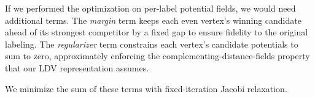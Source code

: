 \documentclass[journal]{vgtc}                     %
\begin{document}
If we performed the optimization on per-label potential fields, we would need additional terms. The \emph{margin} term keeps each even vertex's winning candidate ahead of its strongest competitor by a fixed gap to ensure fidelity to the original labeling.
The \emph{regularizer} term constrains each vertex's candidate potentials to sum to zero, approximately enforcing the complementing-distance-fields property that our LDV representation assumes.


We minimize the sum of these terms with fixed-iteration Jacobi relaxation.
\end{document}
